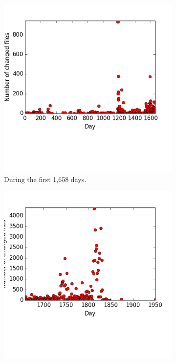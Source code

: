 \documentclass[11pt]{article}
\def \iostarted {1,658}
\begin{document}

    \begin{figure}
    \centering
    \begin{subfigure}{.5\textwidth}
      \centering
      \includegraphics[width=\linewidth]{images/file_changes_per_day_first.png}
      \caption{During the first \iostarted{} days.}
    \end{subfigure}%
    \begin{subfigure}{.5\textwidth}
      \centering
      \includegraphics[width=\linewidth]{images/file_changes_per_day_last.png}

\end{subfigure}
\end{figure}
\end{document}
